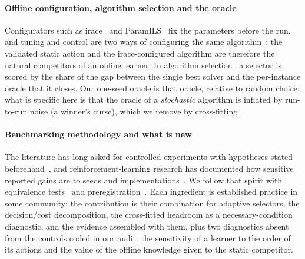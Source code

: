\paragraph{Offline configuration, algorithm selection and the oracle} Configurators such as irace~\cite{LopezIbanezEtal2016} and ParamILS~\cite{HutterEtal2009} fix the parameters before the run, and tuning and control are two ways of configuring the same algorithm~\cite{EibenSmit2011}; the validated static action and the irace-configured algorithm are therefore the natural competitors of an online learner. In algorithm selection~\cite{Rice1976,KerschkeEtal2019,BischlEtal2016} a selector is scored by the share of the gap between the single best solver and the per-instance oracle that it closes. Our one-seed oracle is that oracle, relative to random choice; what is specific here is that the oracle of a \emph{stochastic} algorithm is inflated by run-to-run noise (a winner's curse), which we remove by cross-fitting~\cite{ChernozhukovEtal2018}.

\paragraph{Benchmarking methodology and what is new} The literature has long asked for controlled experiments with hypotheses stated beforehand~\cite{Hooker1995,BarrEtal1995,LaTorreEtal2021,BartzBeielsteinEtal2020}, and reinforcement-learning research has documented how sensitive reported gains are to seeds and implementations~\cite{Henderson2018}. We follow that spirit with equivalence tests~\cite{Lakens2017} and preregistration~\cite{NosekEtal2018}. Each ingredient is established practice in some community; the contribution is their combination for adaptive selectors, the decision/cost decomposition, the cross-fitted headroom as a necessary-condition diagnostic, and the evidence assembled with them, plus two diagnostics absent from the controls coded in our audit: the sensitivity of a learner to the order of its actions and the value of the offline knowledge given to the static competitor.
